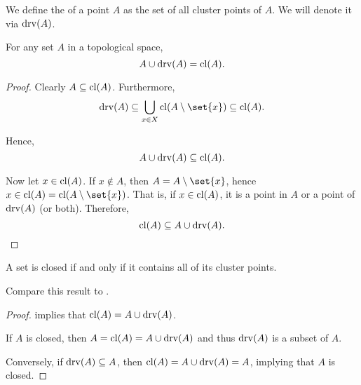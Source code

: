 \begin{definition}\label{def:derived_set}
  We define the  of a point \( A \) as the set of all cluster points of \( A \). We will denote it via \( \operatorname{drv}(A) \).
\end{definition}

\begin{proposition}\label{thm:union_with_derived_set}
  For any set \( A \) in a topological space,
  \begin{equation*}
    A \cup \operatorname{drv}(A) = \operatorname{cl}(A).
  \end{equation*}
\end{proposition}
\begin{proof}
  Clearly \( A \subseteq \operatorname{cl}(A) \). Furthermore,
  \begin{equation*}
    \drv(A) \subseteq \bigcup_{x \in X} \cl(A \setminus \set{ x }) \subseteq \cl(A).
  \end{equation*}

  Hence,
  \begin{equation*}
    A \cup \operatorname{drv}(A) \subseteq \operatorname{cl}(A).
  \end{equation*}

  Now let \( x \in \operatorname{cl}(A) \). If \( x \not\in A \), then \( A = A \setminus \set{ x } \), hence \( x \in \cl(A) = \cl(A \setminus \set{ x }) \). That is, if \( x \in \operatorname{cl}(A) \), it is a point in \( A \) or a point of \( \operatorname{drv}(A) \) (or both). Therefore,
  \begin{equation*}
    \operatorname{cl}(A) \subseteq A \cup \operatorname{drv}(A).
  \end{equation*}
\end{proof}

\begin{corollary}\label{thm:cluster_point_characterization}
  A set is closed if and only if it contains all of its cluster points.
\end{corollary}
\begin{comments}
  \item Compare this result to .
\end{comments}
\begin{proof}
   implies that \( \operatorname{cl}(A) = A \cup \operatorname{drv}(A) \).

  If \( A \) is closed, then \( A = \operatorname{cl}(A) = A \cup \operatorname{drv}(A) \) and thus \( \operatorname{drv}(A) \) is a subset of \( A \).

  Conversely, if \( \operatorname{drv}(A) \subseteq A \), then \( \operatorname{cl}(A) = A \cup \operatorname{drv}(A) = A \), implying that \( A \) is closed.
\end{proof}

